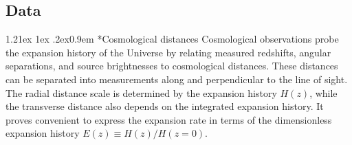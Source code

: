 \documentclass[aps,prd,reprint,preprintnumbers,showpacs,floatfix,nofootinbib,superscriptaddress]{revtex4-2}
\makeatletter
\renewcommand{\paragraph}{%
\@startsection{paragraph}{4}%
{\z@}{1.21ex \@plus 1ex \@minus .2ex}{0.9em}%
{\normalfont\normalsize\bfseries}%
}
\makeatother
\begin{document}
\subsection{Data}
\paragraph*{Cosmological distances} Cosmological observations probe the expansion history of the Universe by relating measured redshifts, angular separations, and source brightnesses to cosmological distances. These distances can be separated into measurements along and perpendicular to the line of sight. The radial distance scale is determined by the expansion history $H(z)$, while the transverse distance also depends on the integrated expansion history. It proves convenient to express the expansion rate in terms of the dimensionless expansion history $E(z)\equiv H(z)/H(z=0)$.
\end{document}
